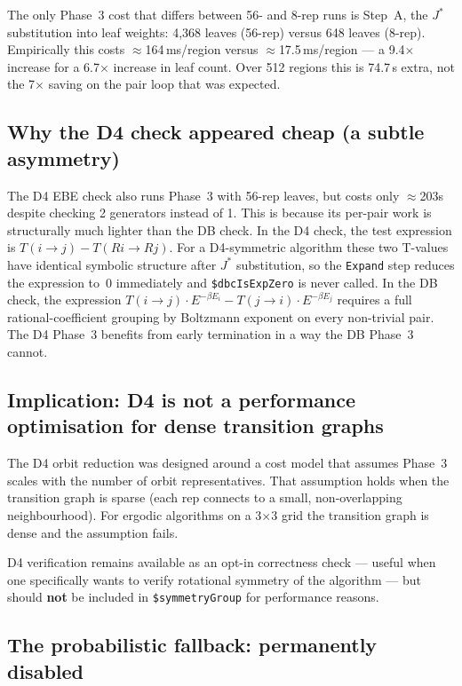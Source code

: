 \documentclass[12pt,a4paper]{article}
\theoremstyle{critical}
\theoremstyle{remark}
\theoremstyle{verified}
\begin{document}
The only Phase~3 cost that differs between 56- and 8-rep runs is Step~A, the
$J^\ast$ substitution into leaf weights: 4{,}368 leaves (56-rep) versus 648 leaves
(8-rep).  Empirically this costs $\approx$164\,ms/region versus $\approx$17.5\,ms/region
--- a 9.4$\times$ increase for a 6.7$\times$ increase in leaf count.
Over 512 regions this is 74.7\,s extra, not the 7$\times$ saving on the pair loop
that was expected.

\subsection{Why the D4 check appeared cheap (a subtle asymmetry)}

The D4 EBE check also runs Phase~3 with 56-rep leaves, but costs only
$\approx$203s despite checking 2 generators instead of 1.  This is because its
per-pair work is structurally much lighter than the DB check.  In the D4 check,
the test expression is $T(i\to j) - T(Ri\to Rj)$.  For a D4-symmetric algorithm
these two T-values have identical symbolic structure after $J^\ast$ substitution,
so the \texttt{Expand} step reduces the expression to~0 immediately and
\texttt{\$dbcIsExpZero} is never called.  In the DB check, the expression
$T(i\to j)\cdot E^{-\beta E_i} - T(j\to i)\cdot E^{-\beta E_j}$ requires a full
rational-coefficient grouping by Boltzmann exponent on every non-trivial pair.
The D4 Phase~3 benefits from early termination in a way the DB Phase~3 cannot.

\subsection{Implication: D4 is not a performance optimisation for dense transition graphs}

The D4 orbit reduction was designed around a cost model that assumes Phase~3
scales with the number of orbit representatives.  That assumption holds when the
transition graph is sparse (each rep connects to a small, non-overlapping
neighbourhood).  For ergodic algorithms on a 3$\times$3 grid the transition graph
is dense and the assumption fails.

D4 verification remains available as an opt-in correctness check --- useful when
one specifically wants to verify rotational symmetry of the algorithm --- but
should \textbf{not} be included in \texttt{\$symmetryGroup} for performance
reasons.

\subsection{The probabilistic fallback: permanently disabled}
\end{document}
